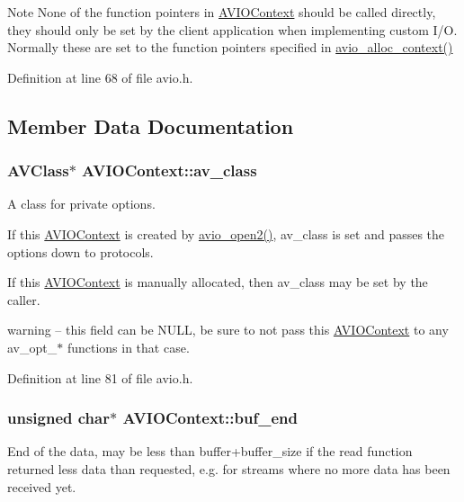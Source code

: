 \begin{DoxyNote}{Note}
None of the function pointers in \hyperlink{struct_a_v_i_o_context}{A\+V\+I\+O\+Context} should be called directly, they should only be set by the client application when implementing custom I/O. Normally these are set to the function pointers specified in \hyperlink{avio_8h_a853f5149136a27ffba3207d8520172a5}{avio\+\_\+alloc\+\_\+context()} 
\end{DoxyNote}


Definition at line 68 of file avio.\+h.



\subsection{Member Data Documentation}
\subsubsection[{\texorpdfstring{av\+\_\+class}{av_class}}]{ {\bf A\+V\+Class}$\ast$ A\+V\+I\+O\+Context\+::av\+\_\+class}\hypertarget{struct_a_v_i_o_context_a25d3b039ac00850a25d7b772566db6a8}{}\label{struct_a_v_i_o_context_a25d3b039ac00850a25d7b772566db6a8}
A class for private options.

If this \hyperlink{struct_a_v_i_o_context}{A\+V\+I\+O\+Context} is created by \hyperlink{avio_8h_ade8a63980569494c99593ebf0d1e891b}{avio\+\_\+open2()}, av\+\_\+class is set and passes the options down to protocols.

If this \hyperlink{struct_a_v_i_o_context}{A\+V\+I\+O\+Context} is manually allocated, then av\+\_\+class may be set by the caller.

warning -- this field can be N\+U\+LL, be sure to not pass this \hyperlink{struct_a_v_i_o_context}{A\+V\+I\+O\+Context} to any av\+\_\+opt\+\_\+$\ast$ functions in that case. 

Definition at line 81 of file avio.\+h.

\subsubsection[{\texorpdfstring{buf\+\_\+end}{buf_end}}]{\setlength{\rightskip}{0pt plus 5cm}unsigned char$\ast$ A\+V\+I\+O\+Context\+::buf\+\_\+end}\hypertarget{struct_a_v_i_o_context_a0683d1a134b647c54f6d087d152c9a64}{}\label{struct_a_v_i_o_context_a0683d1a134b647c54f6d087d152c9a64}
End of the data, may be less than buffer+buffer\+\_\+size if the read function returned less data than requested, e.\+g. for streams where no more data has been received yet. 

